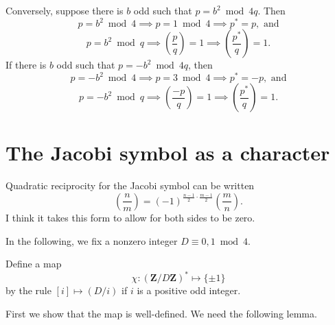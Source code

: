 \documentclass[b5paper,12pt,oneside,openright]{memoir}
\newcommand{\jacobi}[2]{\left(\frac{#1}{#2}\right)}
\begin{document}
Conversely, suppose there is $b$ odd such that $p=b^2\bmod 4q$. Then
\[p=b^2\bmod 4\implies p=1\bmod 4\implies p^*=p,\textrm{ and}\]
\[p=b^2\bmod q\implies\jacobi{p}{q}=1\implies\jacobi{p^*}{q}=1.\]
If there is $b$ odd such that $p=-b^2\bmod 4q$, then
\[p=-b^2\bmod 4\implies p=3\bmod 4\implies p^*=-p,\textrm{ and}\]
\[p=-b^2\bmod q\implies\jacobi{-p}{q}=1\implies\jacobi{p^*}{q}=1.\]

\section{The Jacobi symbol as a character}

Quadratic reciprocity for the Jacobi symbol can be written
\[\left(\frac{n}{m}\right) = (-1)^{\frac{n-1}{2}\cdot\frac{m-1}{2}} \left(\frac{m}{n}\right).\]
I think it takes this form to allow for both sides to be zero.

In the following, we fix a nonzero integer $D\equiv 0, 1\bmod 4$.

Define a map
\[\chi:(\mathbf{Z}/D\mathbf{Z})^* \mapsto \{\pm 1\}\]
by the rule $[i]\mapsto (D/i)$ if $i$ is a positive odd integer.

First we show that the map is well-defined. We need the following lemma.
\end{document}
